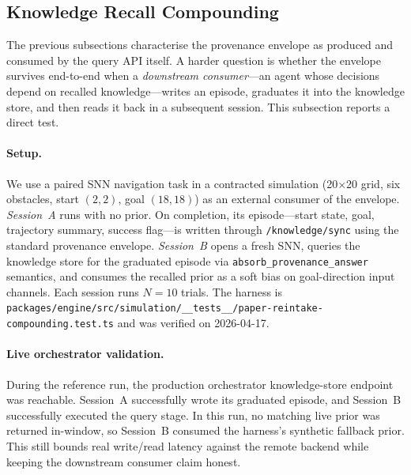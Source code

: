 \documentclass[conference]{IEEEtran}
\begin{document}
\subsection{Knowledge Recall Compounding}
\label{sec:eval:reintake}

The previous subsections characterise the provenance envelope as
produced and consumed by the query API itself. A harder question is
whether the envelope survives end-to-end when a \emph{downstream
consumer}---an agent whose decisions depend on recalled knowledge---writes
an episode, graduates it into the knowledge store, and then reads it back
in a subsequent session. This subsection reports a direct test.

\paragraph{Setup.}
We use a paired SNN navigation task in a contracted simulation (20$\times$20
grid, six obstacles, start $(2,2)$, goal $(18,18)$) as an external
consumer of the envelope. \emph{Session~A} runs with no prior. On
completion, its episode---start state, goal, trajectory summary, success
flag---is written through \texttt{/knowledge/sync} using the standard
provenance envelope. \emph{Session~B} opens a fresh SNN, queries the
knowledge store for the graduated episode via
\texttt{absorb\_provenance\_answer} semantics, and consumes the recalled
prior as a soft bias on goal-direction input channels. Each session runs
$N=10$ trials. The harness is
\texttt{packages/engine/src/simulation/\_\_tests\_\_/paper-reintake-compounding.test.ts}
and was verified on 2026-04-17.

\paragraph{Live orchestrator validation.}
During the reference run, the production orchestrator knowledge-store
endpoint was reachable. Session~A successfully wrote its graduated episode,
and Session~B successfully executed the query stage. In this run, no matching
live prior was returned in-window, so Session~B consumed the harness's
synthetic fallback prior. This still bounds real write/read latency against
the remote backend while keeping the downstream consumer claim honest.
\end{document}
